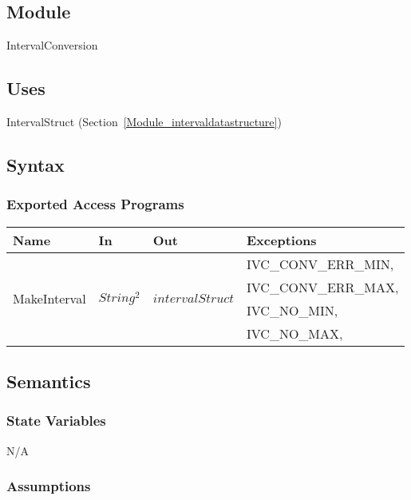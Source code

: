 \documentclass[12pt, titlepage]{article}
\begin{document}
\subsection{Module}

IntervalConversion

\subsection{Uses}

IntervalStruct (Section~\ref{Module_intervaldatastructure})

\subsection{Syntax}

\subsubsection{Exported Access Programs}

\begin{center}
	\begin{tabular}{p{3cm} p{2.3cm} p{3cm} p{5cm}}
		\hline
		\textbf{Name} & \textbf{In} & \textbf{Out} & \textbf{Exceptions} \\
		\hline
		\multirow{4}{3cm}{MakeInterval} & \multirow{4}{2.3cm}{$String^2$} & 
		\multirow{4}{3cm}{$intervalStruct$} & IVC\_CONV\_ERR\_MIN, \\
		& & & IVC\_CONV\_ERR\_MAX, \\
		& & & IVC\_NO\_MIN, \\
		& & & IVC\_NO\_MAX,\\
		\hline
	\end{tabular}
\end{center}

\subsection{Semantics}

\subsubsection{State Variables}

N/A

\subsubsection{Assumptions}
\end{document}
